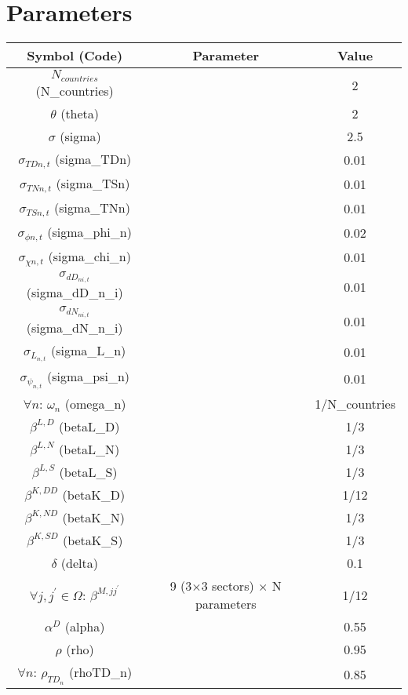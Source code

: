 \documentclass[12pt, bibtotoc, tablecaptionabove, figurecaptionabove, fleqn]{article}
\begin{document}
\section{Parameters}
{\small
\begin{center}
	\begin{tabular}{ccc} 
		\hline
		\hline
		Symbol (Code) & Parameter & Value \\ 
		\hline
		$N_{countries}$ (N\_{countries}) & & 2 \\ 		
		$\theta$ (theta) & & 2 \\ 
		$\sigma$ (sigma) & & 2.5 \\
		$\sigma_{TDn,t}$ (sigma\_TDn) & & 0.01 \\
		$\sigma_{TNn,t}$ (sigma\_TSn) & & 0.01 \\
		$\sigma_{TSn,t}$ (sigma\_TNn) & & 0.01 \\
		$\sigma_{\phi n,t}$ (sigma\_phi\_n) & & 0.02 \\				$\sigma_{\chi n,t}$ (sigma\_chi\_n) & & 0.01 \\
                $\sigma_{dD_{ni,t}}$ (sigma\_dD\_n\_i) & & 0.01 \\
                $\sigma_{dN_{ni,t}}$ (sigma\_dN\_n\_i) & & 0.01 \\                
                $\sigma_{L_{n,t}}$ (sigma\_L\_n) & & 0.01 \\
                $\sigma_{\psi_{n,t}}$ (sigma\_psi\_n) & & 0.01 \\		                
		$\forall n$: $\omega_n$ (omega\_n) & & 1/N\_{countries}\\
		$\beta^{L,D}$ (betaL\_D) & & 1/3  \\
                $\beta^{L,N}$ (betaL\_N) & & 1/3 \\
                $\beta^{L,S}$ (betaL\_S) & & 1/3  \\                
		$\beta^{K,DD}$ (betaK\_D) & & 1/12\\
		$\beta^{K,ND}$ (betaK\_N) & & 1/3\\
		$\beta^{K,SD}$ (betaK\_S) & & 1/3\\		
		$\delta$ (delta) & & 0.1 \\
		$\forall j, j^{\prime} \in \Omega$: $\beta^{M, j j^{\prime}}$ & 9 (3$\times$3 sectors) $\times$ N parameters & 1/12\\
 		$\alpha^D$ (alpha) & & 0.55 \\ 
		$\rho$ (rho) & & 0.95 \\ 
		$\forall n$: $\rho_{TD_n}$ (rhoTD\_n) & & 0.85 \\ 

\end{tabular}
\end{center}}
\end{document}
